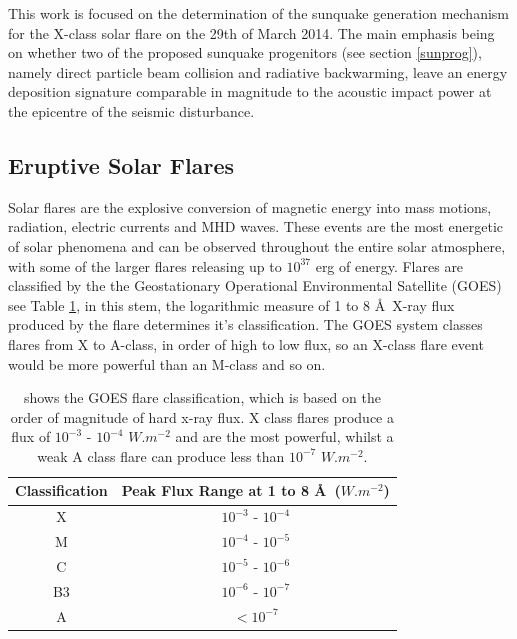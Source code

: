 This work is focused on the determination of the sunquake generation mechanism for the X-class solar flare on the 29th of March 2014. The main emphasis being on whether two of the proposed sunquake progenitors (see section \ref{sunprog}), namely direct particle beam collision and radiative backwarming, leave an energy deposition signature comparable in magnitude to the acoustic impact power at the epicentre of the seismic disturbance.      




\subsection{Eruptive Solar Flares}\label{flares}

Solar flares are the explosive conversion of magnetic energy into mass motions, radiation, electric currents and MHD waves. These events are the most energetic of solar phenomena and can be observed throughout the entire solar atmosphere, with some of the larger flares releasing up to $10^{37}$ erg of energy. Flares are classified by the the Geostationary Operational Environmental Satellite (GOES) see Table \ref{goes}, in this stem, the logarithmic measure of 1 to 8 \AA\ X-ray flux produced by the flare determines it's classification. The GOES system classes flares from X to A-class, in order of high to low flux, so an X-class flare event would be more powerful than an M-class and so on. \\

\begin{table}[h]
\centering
\begin{tabular}{|c|c|}\label{GOES}
Classification & Peak Flux Range at 1 to 8 \AA\ ($W.m^{-2}$) \\
\hline
X & $10^{-3}$ - $10^{-4}$\\
M & $10^{-4}$ - $10^{-5}$\\
C & $10^{-5}$ - $10^{-6}$\\
B3 & $10^{-6}$ - $10^{-7}$\\
A & $<10^{-7}$\\
\end{tabular}
\caption{shows the GOES flare classification, which is based on the order of magnitude of hard x-ray flux. X class flares produce a flux of $10^{-3}$ - $10^{-4}$ $W.m^{-2}$ and are the most powerful, whilst a weak A class flare can produce less than $10^{-7}$ $W.m^{-2}$.}\label{goes}
\end{table}

